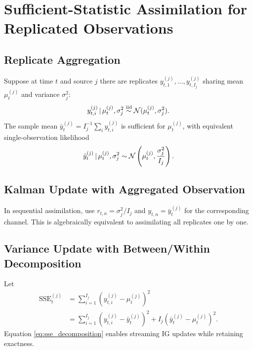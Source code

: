 \section{Sufficient-Statistic Assimilation for Replicated Observations}

\subsection{Replicate Aggregation}
Suppose at time $t$ and source $j$ there are replicates
$y_{t,1}^{(j)},\dots,y_{t,I_j}^{(j)}$ sharing mean $\mu_t^{(j)}$ and variance $\sigma_j^2$:
\begin{align}
y_{t,i}^{(j)}\,|\,\mu_t^{(j)},\sigma_j^2\stackrel{\mathrm{iid}}{\sim} \mathcal{N}(\mu_t^{(j)},\sigma_j^2).
\end{align}
The sample mean $\bar y_t^{(j)}=I_j^{-1}\sum_i y_{t,i}^{(j)}$ is sufficient for $\mu_t^{(j)}$,
with equivalent single-observation likelihood
\begin{align}
\bar y_t^{(j)}\,|\,\mu_t^{(j)},\sigma_j^2
\sim \mathcal{N}\left(\mu_t^{(j)},\frac{\sigma_j^2}{I_j}\right).
\label{eq:replicate_sufficient}
\end{align}

\subsection{Kalman Update with Aggregated Observation}
In sequential assimilation, use
$r_{t,n}=\sigma_j^2/I_j$ and $y_{t,n}=\bar y_t^{(j)}$ for the corresponding channel.
This is algebraically equivalent to assimilating all replicates one by one.

\subsection{Variance Update with Between/Within Decomposition}
Let
\begin{align}
\mathrm{SSE}_{t}^{(j)}
&= \sum_{i=1}^{I_j}\left(y_{t,i}^{(j)}-\mu_t^{(j)}\right)^2 \\
&= \sum_{i=1}^{I_j}\left(y_{t,i}^{(j)}-\bar y_t^{(j)}\right)^2
+ I_j\left(\bar y_t^{(j)}-\mu_t^{(j)}\right)^2.
\label{eq:sse_decomposition}
\end{align}
Equation \eqref{eq:sse_decomposition} enables streaming IG updates while retaining exactness.

